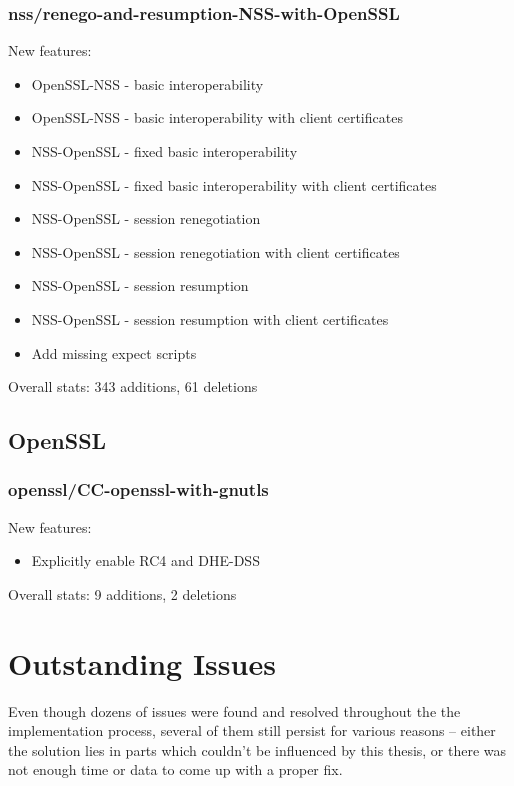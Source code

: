 \subsubsection{nss/renego-and-resumption-NSS-with-OpenSSL}
    New features:
    \begin{itemize}
        \item OpenSSL-NSS - basic interoperability
        \item OpenSSL-NSS - basic interoperability with client certificates
        \item NSS-OpenSSL - fixed basic interoperability
        \item NSS-OpenSSL - fixed basic interoperability with client
            certificates
        \item NSS-OpenSSL - session renegotiation
        \item NSS-OpenSSL - session renegotiation with client certificates
        \item NSS-OpenSSL - session resumption
        \item NSS-OpenSSL - session resumption with client certificates
        \item Add missing expect scripts
    \end{itemize}

    \noindent Overall stats: 343 additions, 61 deletions

\subsection{OpenSSL}
\subsubsection{openssl/CC-openssl-with-gnutls}
    New features:
    \begin{itemize}
        \item Explicitly enable RC4 and DHE-DSS
    \end{itemize}

    \noindent Overall stats: 9 additions, 2 deletions

\section{Outstanding Issues}
    Even though dozens of issues were found and resolved throughout the
    the implementation process, several of them still persist for various reasons
    -- either the solution lies in parts which couldn't be influenced by
    this thesis, or there was not enough time or data to come up with a proper
    fix.

